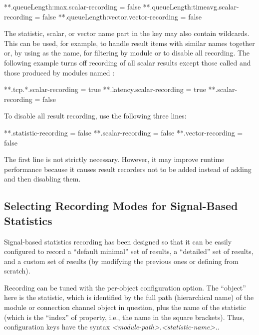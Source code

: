 \begin{inifile}
**.queueLength:max.scalar-recording = false
**.queueLength:timeavg.scalar-recording = false
**.queueLength:vector.vector-recording = false
\end{inifile}

The statistic, scalar, or vector name part in the key may also contain
wildcards. This can be used, for example, to handle result items with similar
names together or, by using \ttt{*} as the name, for filtering by module or to
disable all recording. The following example turns off recording of all scalar
results except those called  and those produced by modules named
:

\begin{inifile}
**.tcp.*.scalar-recording = true
**.latency.scalar-recording = true
**.scalar-recording = false
\end{inifile}

To disable all result recording, use the following three lines:

\begin{inifile}
**.statistic-recording = false
**.scalar-recording = false
**.vector-recording = false
\end{inifile}

The first line is not strictly necessary. However, it may improve runtime
performance because it causes result recorders not to be added instead of adding
and then disabling them.

\subsection{Selecting Recording Modes for Signal-Based Statistics}
\label{sec:ana-sim:configuring-recording-modes}

Signal-based statistics recording has been designed so that it can be easily
configured to record a ``default minimal'' set of results, a ``detailed'' set of
results, and a custom set of results (by modifying the previous ones or defining
from scratch).

Recording can be tuned with the  per-object
configuration option. The ``object'' here is the statistic, which is identified by
the full path (hierarchical name) of the module or connection channel object in
question, plus the name of the statistic (which is the ``index'' of
 property, i.e., the name in the square brackets). Thus,
configuration keys have the syntax
\textit{<module-path>.<statistic-name>.}.

